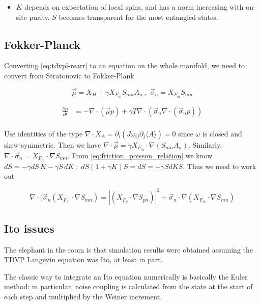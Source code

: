         \begin{itemize}
            \item $K$ depends on expectation of local spins, and has a norm increasing with on-site purity. $S$ becomes transparent for the most entangled states.
        \end{itemize}



    \subsection{Fokker-Planck}
        Converting \ref{eq:tdvpl-rearr} to an equation on the whole manifold, we need to convert from Stratonovic to Fokker-Plank

        $$
        \vec\mu = X_H + \gamma X_{F_m}S_{mn}A_n\; , \;
        \vec\sigma_{n} = X_{F_m}S_{mn}
        $$

        \begin{align*}
        \frac{\partial p}{\partial t} &= -\nabla\cdot (\vec \mu p)+\gamma T \nabla\cdot(\vec \sigma_n\nabla\cdot(\vec \sigma_n p)) \\
        \end{align*}

        Use identities of the type $\nabla \cdot X_A = \partial_i (J\omega_{ij}\partial_j\langle A \rangle)=0$ since $\omega$ is closed and skew-symmetric. Then we have $\nabla\cdot\vec\mu = \gamma X_{F_m}\cdot\nabla(S_{mn} A_n)$. Similarly, $\nabla\cdot\vec\sigma_n = X_{F_m}\cdot\nabla S_{mn}$. From \ref{eq:friction_poisson_relation} we know $dS = -\gamma dS\,K - \gamma S \, dK \; ; \; dS(1+\gamma K)S = dS = -\gamma S dKS$. Thus we need to work out 

        $$
        \nabla\cdot(\vec\sigma_n (X_{F_m}\cdot\nabla S_{mn}) = |(X_{F_p}\cdot \nabla S_{pn})|^2 + \vec\sigma_n\cdot\nabla(X_{F_m}\cdot\nabla S_{mn})
        $$

        \subsection{Ito issues}
        The elephant in the room is that simulation results were obtained assuming the TDVP Langevin equation was Ito, at least in part.

        The classic way to integrate an Ito equation numerically is basically the Euler method: in particular, noise coupling is calculated from the state at the start of each step and multiplied by the Weiner increment.

